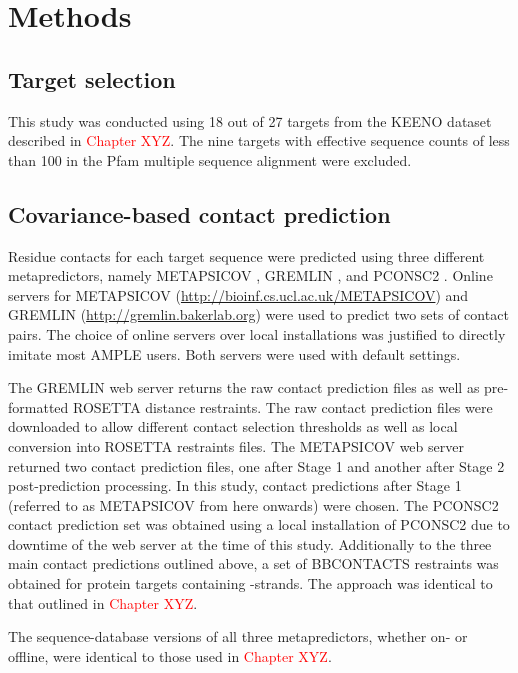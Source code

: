 \section{Methods}

\subsection{Target selection}
This study was conducted using 18 out of 27 targets from the KEENO dataset described in \textcolor{red}{Chapter XYZ}. The nine targets with effective sequence counts of less than 100 in the Pfam multiple sequence alignment were excluded.

\subsection{Covariance-based contact prediction}
Residue contacts for each target sequence were predicted using three different metapredictors, namely METAPSICOV \cite{Jones2015-wp}, GREMLIN \cite{Kamisetty2013-bs}, and PCONSC2 \cite{Skwark2014-mu}. Online servers for METAPSICOV (\url{http://bioinf.cs.ucl.ac.uk/METAPSICOV}) and GREMLIN (\url{http://gremlin.bakerlab.org}) were used to predict two sets of contact pairs. The choice of online servers over local installations was justified to directly imitate most AMPLE users. Both servers were used with default settings.

The GREMLIN web server returns the raw contact prediction files as well as pre-formatted ROSETTA distance restraints. The raw contact prediction files were downloaded to allow different contact selection thresholds as well as local conversion into ROSETTA restraints files. The METAPSICOV web server returned two contact prediction files, one after Stage 1 and another after Stage 2 post-prediction processing. In this study, contact predictions after Stage 1 (referred to as METAPSICOV from here onwards) were chosen. The PCONSC2 contact prediction set was obtained using a local installation of PCONSC2 due to downtime of the web server at the time of this study. Additionally to the three main contact predictions outlined above, a set of BBCONTACTS restraints was obtained for protein targets containing \textbeta-strands. The approach was identical to that outlined in \textcolor{red}{Chapter XYZ}.

The sequence-database versions of all three metapredictors, whether on- or offline, were identical to those used in \textcolor{red}{Chapter XYZ}.

